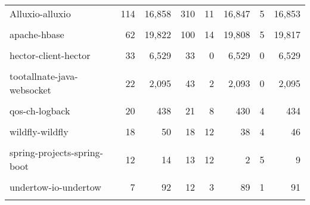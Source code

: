 \begin{table}[t]
\begin{tabular}{l|r|rr|rr|rr}
Alluxio-alluxio&114&16,858&310&11&16,847&5&16,853\\
\cellcolor{gray!6}{square-okhttp}&\cellcolor{gray!6}{100}&\cellcolor{gray!6}{28,264}&\cellcolor{gray!6}{121}&\cellcolor{gray!6}{40}&\cellcolor{gray!6}{28,224}&\cellcolor{gray!6}{17}&\cellcolor{gray!6}{28,247}\\
apache-hbase&62&19,822&100&14&19,808&5&19,817\\
\cellcolor{gray!6}{apache-ambari}&\cellcolor{gray!6}{51}&\cellcolor{gray!6}{4,063}&\cellcolor{gray!6}{54}&\cellcolor{gray!6}{0}&\cellcolor{gray!6}{4,063}&\cellcolor{gray!6}{0}&\cellcolor{gray!6}{4,063}\\
hector-client-hector&33&6,529&33&0&6,529&0&6,529\\
\cellcolor{gray!6}{activiti-activiti}&\cellcolor{gray!6}{31}&\cellcolor{gray!6}{1,378}&\cellcolor{gray!6}{32}&\cellcolor{gray!6}{13}&\cellcolor{gray!6}{1,365}&\cellcolor{gray!6}{6}&\cellcolor{gray!6}{1,372}\\
tootallnate-java-websocket&22&2,095&43&2&2,093&0&2,095\\
\cellcolor{gray!6}{apache-httpcore}&\cellcolor{gray!6}{22}&\cellcolor{gray!6}{354}&\cellcolor{gray!6}{22}&\cellcolor{gray!6}{9}&\cellcolor{gray!6}{345}&\cellcolor{gray!6}{2}&\cellcolor{gray!6}{352}\\
qos-ch-logback&20&438&21&8&430&4&434\\
\cellcolor{gray!6}{kevinsawicki-http-request}&\cellcolor{gray!6}{18}&\cellcolor{gray!6}{3,501}&\cellcolor{gray!6}{18}&\cellcolor{gray!6}{3}&\cellcolor{gray!6}{3,498}&\cellcolor{gray!6}{0}&\cellcolor{gray!6}{3,501}\\
wildfly-wildfly&18&50&18&12&38&4&46\\
\cellcolor{gray!6}{wro4j-wro4j}&\cellcolor{gray!6}{14}&\cellcolor{gray!6}{10,833}&\cellcolor{gray!6}{21}&\cellcolor{gray!6}{3}&\cellcolor{gray!6}{10,830}&\cellcolor{gray!6}{2}&\cellcolor{gray!6}{10,831}\\
spring-projects-spring-boot&12&14&13&12&2&5&9\\
\cellcolor{gray!6}{orbit-orbit}&\cellcolor{gray!6}{7}&\cellcolor{gray!6}{2,943}&\cellcolor{gray!6}{7}&\cellcolor{gray!6}{0}&\cellcolor{gray!6}{2,943}&\cellcolor{gray!6}{0}&\cellcolor{gray!6}{2,943}\\
undertow-io-undertow&7&92&12&3&89&1&91\\
\cellcolor{gray!6}{doanduyhai-Achilles}&\cellcolor{gray!6}{4}&\cellcolor{gray!6}{165}&\cellcolor{gray!6}{5}&\cellcolor{gray!6}{1}&\cellcolor{gray!6}{164}&\cellcolor{gray!6}{1}&\cellcolor{gray!6}{164}\\

\end{tabular}
\end{table}
